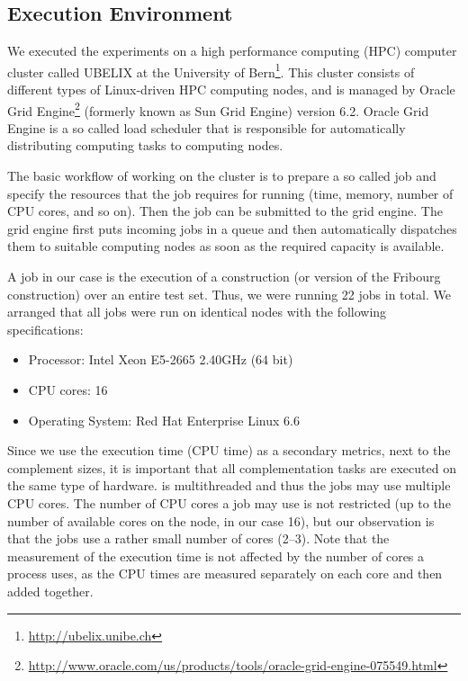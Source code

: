 \subsection{Execution Environment}
We executed the experiments on a high performance computing (HPC) computer cluster called UBELIX at the University of Bern\footnote{\url{http://ubelix.unibe.ch}}. This cluster consists of different types of Linux-driven HPC computing nodes, and is managed by Oracle Grid Engine\footnote{\url{http://www.oracle.com/us/products/tools/oracle-grid-engine-075549.html}} (formerly known as Sun Grid Engine) version 6.2. Oracle Grid Engine is a so called load scheduler that is responsible for automatically distributing computing tasks to computing nodes.

The basic workflow of working on the cluster is to prepare a so called job and specify the resources that the job requires for running (time, memory, number of CPU cores, and so on). Then the job can be submitted to the grid engine. The grid engine first puts incoming jobs in a queue and then automatically dispatches them to suitable computing nodes as soon as the required capacity is available.

A job in our case is the execution of a construction (or version of the Fribourg construction) over an entire test set. Thus, we were running 22 jobs in total. We arranged that all jobs were run on identical nodes with the following specifications:

\begin{itemize}
\item Processor: Intel Xeon E5-2665 2.40GHz (64 bit)
\item CPU cores: 16
\item Operating System: Red Hat Enterprise Linux 6.6
\end{itemize}

Since we use the execution time (CPU time) as a secondary metrics, next to the complement sizes, it is important that all complementation tasks are executed on the same type of hardware. \goal{} is multithreaded and thus the jobs may use multiple CPU cores. The number of CPU cores a job may use is not restricted (up to the number of available cores on the node, in our case 16), but our observation is that the jobs use a rather small number of cores (2--3). Note that the measurement of the execution time is not affected by the number of cores a process uses, as the CPU times are measured separately on each core and then added together.  

